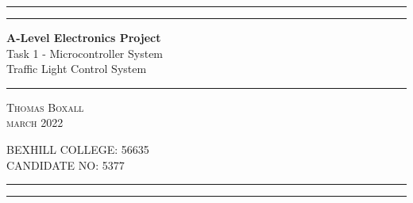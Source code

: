 \begin{titlepage} %
	
	\centering %
	
	
	\rule{\textwidth}{1pt} %
	
	\vspace{2pt}\vspace{-\baselineskip} %
	
	\rule{\textwidth}{0.4pt} %
	
	\vspace{0.1\textheight} %
	

	{\Huge \textbf{A-Level Electronics Project}}\\[0.5\baselineskip] %
	{\huge Task 1 - Microcontroller System}\\[0.5\baselineskip] %
	{\LARGE Traffic Light Control System} %

	
	\vspace{0.025\textheight} %
	
	\rule{0.3\textwidth}{0.4pt} %

	
	\vspace{0.1\textheight} %
	
	
	{\Large \textsc{Thomas Boxall}} \\%
	{\large\textsc{march 2022}} %
	
	\vfill %
	
	
	{\large\textsc{BEXHILL COLLEGE: 56635}} \\
	{\large\textsc{CANDIDATE NO: 5377}}
	
	\vspace{0.1\textheight} %
	
	
	\rule{\textwidth}{0.4pt} %
	
	\vspace{2pt}\vspace{-\baselineskip} %
	
	\rule{\textwidth}{1pt} %
	
\end{titlepage}